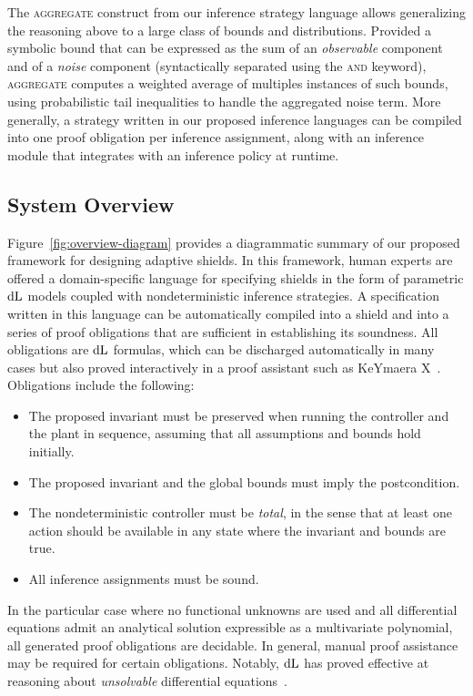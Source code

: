 \documentclass[acmsmall,screen,nonacm]{acmart}
\begin{document}
The \textsc{aggregate} construct from our inference strategy language allows generalizing the reasoning above to a large class of bounds and distributions. Provided a symbolic bound that can be expressed as the sum of an \emph{observable} component and of a \emph{noise} component (syntactically separated using the \textsc{and} keyword), \textsc{aggregate} computes a weighted average of multiples instances of such bounds, using probabilistic tail inequalities to handle the aggregated noise term. More generally, a strategy written in our proposed inference languages can be compiled into one proof obligation per inference assignment, along with an inference module that integrates with an inference policy at runtime. %

\subsection{System Overview}



Figure~\ref{fig:overview-diagram} provides a diagrammatic summary of our proposed framework for designing adaptive shields. In this framework, human experts are offered a domain-specific language for specifying shields in the form of parametric $\mathop{}\!\mathrm{d} \text{L}$ models coupled with nondeterministic inference strategies. A specification written in this language can be automatically compiled into a shield and into a series of proof obligations that are sufficient in establishing its soundness. All obligations are $\mathop{}\!\mathrm{d} \text{L}$ formulas, which can be discharged automatically in many cases but also proved interactively in a proof assistant such as KeYmaera X~\cite{DBLP:conf/cade/FultonMQVP15}. Obligations include the following:
\begin{itemize}
  \item The proposed invariant must be preserved when running the controller and the plant in sequence, assuming that all assumptions and bounds hold initially.
  \item The proposed invariant and the global bounds must imply the postcondition.
  \item The nondeterministic controller must be \emph{total}, in the sense that at least one action should be available in any state where the invariant and bounds are true.
  \item All inference assignments must be sound.
\end{itemize}
In the particular case where no functional unknowns are used and all differential equations admit an analytical solution expressible as a multivariate polynomial, all generated proof obligations are decidable. In general, manual proof assistance may be required for certain obligations. Notably, $\mathop{}\!\mathrm{d} \text{L}$ has proved effective at reasoning about \emph{unsolvable} differential equations~\cite{platzer2018differential,kabra2022verified}.
\end{document}
